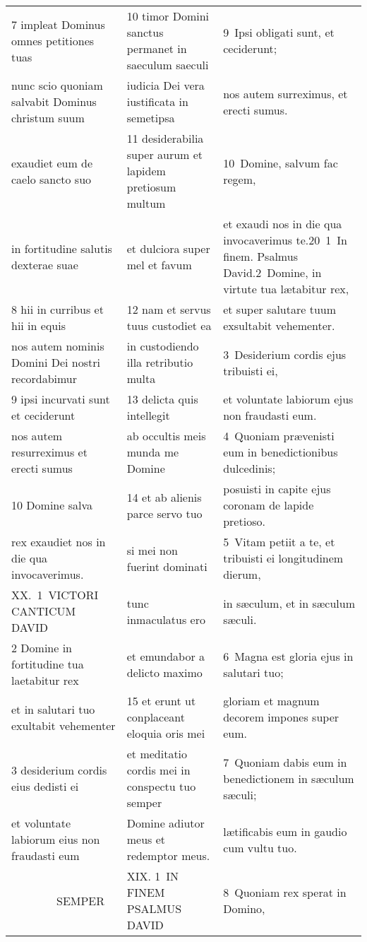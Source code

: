 \documentclass{article}
\begin{document}
\begin{longtable}{@{}p{}p{}p{}@{}}
7 impleat Dominus omnes petitiones tuas	&	10 timor Domini sanctus permanet in saeculum saeculi	&	9 Ipsi obligati sunt, et ceciderunt;	\\
nunc scio quoniam salvabit Dominus christum suum	&	iudicia Dei vera iustificata in semetipsa	&	nos autem surreximus, et erecti sumus.	\\
exaudiet eum de caelo sancto suo	&	11 desiderabilia super aurum et lapidem pretiosum multum	&	10 Domine, salvum fac regem,	\\
in fortitudine salutis dexterae suae	&	et dulciora super mel et favum	&	et exaudi nos in die qua invocaverimus te.20 1 In finem. Psalmus David.2 Domine, in virtute tua lætabitur rex,	\\
8 hii in curribus et hii in equis	&	12 nam et servus tuus custodiet ea	&	et super salutare tuum exsultabit vehementer.	\\
nos autem nominis Domini Dei nostri recordabimur	&	in custodiendo illa retributio multa	&	3 Desiderium cordis ejus tribuisti ei,	\\
9 ipsi incurvati sunt et ceciderunt	&	13 delicta quis intellegit	&	et voluntate labiorum ejus non fraudasti eum.	\\
nos autem resurreximus et erecti sumus	&	ab occultis meis munda me Domine	&	4 Quoniam prævenisti eum in benedictionibus dulcedinis;	\\
10 Domine salva	&	14 et ab alienis parce servo tuo	&	posuisti in capite ejus coronam de lapide pretioso.	\\
rex exaudiet nos in die qua invocaverimus.	&	si mei non fuerint dominati	&	5 Vitam petiit a te, et tribuisti ei longitudinem dierum,	\\
XX. 1 VICTORI CANTICUM DAVID	&	tunc inmaculatus ero	&	in sæculum, et in sæculum sæculi.	\\
2 Domine in fortitudine tua laetabitur rex	&	et emundabor a delicto maximo	&	6 Magna est gloria ejus in salutari tuo;	\\
et in salutari tuo exultabit vehementer	&	15 et erunt ut conplaceant eloquia oris mei	&	gloriam et magnum decorem impones super eum.	\\
3 desiderium cordis eius dedisti ei	&	et meditatio cordis mei in conspectu tuo semper	&	7 Quoniam dabis eum in benedictionem in sæculum sæculi;	\\
et voluntate labiorum eius non fraudasti eum	&	Domine adiutor meus et redemptor meus.	&	lætificabis eum in gaudio cum vultu tuo.	\\
    SEMPER	&	XIX. 1 IN FINEM PSALMUS DAVID	&	8 Quoniam rex sperat in Domino,	\\

\end{longtable}
\end{document}

